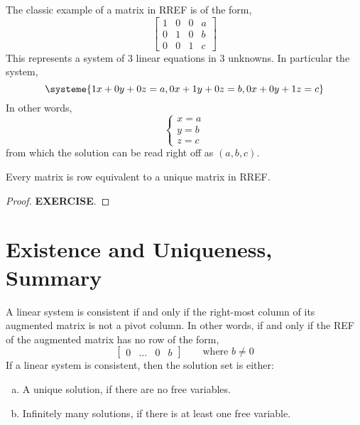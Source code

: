 \documentclass[letterpaper,12pt]{article}
\begin{document}
The classic example of a matrix in RREF is of the form,
\begin{equation*}
    \begin{bmatrix} 1 & 0 & 0 & a \\ 0 & 1 & 0 & b \\ 0 & 0 & 1 & c \end{bmatrix}
\end{equation*}
This represents a system of 3 linear equations in 3 unknowns. In particular the system,
\begin{equation*}
    \systeme{1x + 0y + 0z = a, 0x + 1y + 0z = b, 0x + 0y + 1z = c}
\end{equation*}
In other words,
\begin{equation*}
    \begin{cases} x = a \\ y = b \\ z = c \end{cases}
\end{equation*}
from which the solution can be read right off as $(a,b,c)$.

\begin{theorem}
Every matrix is row equivalent to a unique matrix in RREF.
\end{theorem}
\begin{proof}
\textbf{EXERCISE}.
\end{proof}

\section*{Existence and Uniqueness, Summary}
\begin{theorem}
A linear system is consistent if and only if the right-most column of its augmented matrix is not a pivot column. In other words, if and only if the REF of the augmented matrix has no row of the form,
\begin{equation*}
    \begin{bmatrix} 0 & \dots & 0 & b \end{bmatrix} \qquad \text{where $b \neq 0$}
\end{equation*}
If a linear system is consistent, then the solution set is either:
\begin{enumerate}[(a)]
    \item A unique solution, if there are no free variables.
    \item Infinitely many solutions, if there is at least one free variable.
\end{enumerate}
\end{theorem}
\end{document}
